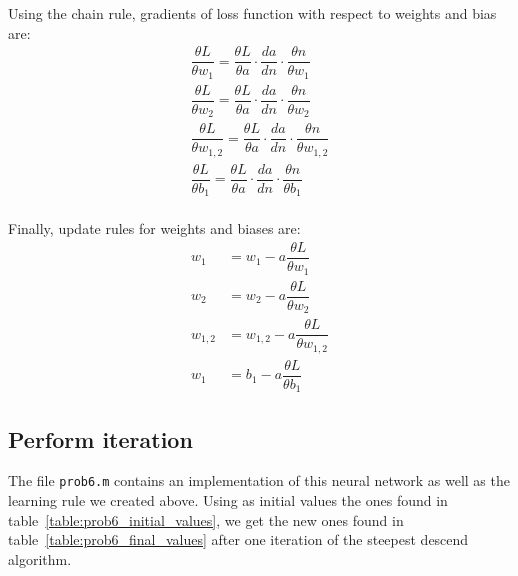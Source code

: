 Using the chain rule, gradients of loss function with respect to weights and bias are:
\[
\begin{array}{l}
	\dfrac{\theta L}{\theta w_1} = \dfrac{\theta L}{\theta a} \cdot \dfrac{da}{dn} \cdot \dfrac{\theta n}{\theta w_1} \\[3mm]
	\dfrac{\theta L}{\theta w_2} = \dfrac{\theta L}{\theta a} \cdot \dfrac{da}{dn} \cdot \dfrac{\theta n}{\theta w_2} \\[3mm]
	\dfrac{\theta L}{\theta w_{1,2}} = \dfrac{\theta L}{\theta a} \cdot \dfrac{da}{dn} \cdot \dfrac{\theta n}{\theta w_{1,2}} \\[3mm]
	\dfrac{\theta L}{\theta b_1} = \dfrac{\theta L}{\theta a} \cdot \dfrac{da}{dn} \cdot \dfrac{\theta n}{\theta b_1} \\[3mm]
\end{array}
\]

Finally, update rules for weights and biases are:
\[
\begin{aligned}
	w_1 &= w_1 - a \dfrac{\theta L}{\theta w_1}\\
	w_2 &= w_2 - a \dfrac{\theta L}{\theta w_2}\\
	w_{1,2} &= w_{1,2} - a \dfrac{\theta L}{\theta w_{1,2}}\\
	w_1 &= b_1 - a \dfrac{\theta L}{\theta b_1}
\end{aligned}
\]


\subsection{Perform iteration}
The file \verb|prob6.m| contains an implementation of this neural network as well as the learning rule we created above.
Using as initial values the ones found in table~\ref{table:prob6_initial_values},
we get the new ones found in table~\ref{table:prob6_final_values} after one iteration of the steepest descend algorithm.

